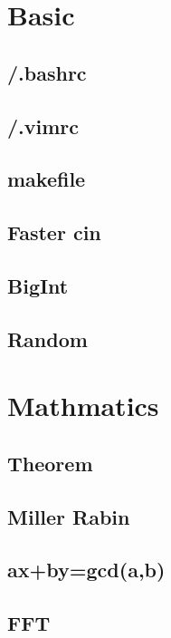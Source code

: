 \section{Basic}

\subsection{/.bashrc}

\subsection{/.vimrc}

\subsection{makefile}

\subsection{Faster cin }

\subsection{BigInt}

\subsection{Random}


\section{Mathmatics}

\subsection{Theorem}

\subsection{Miller Rabin}

\subsection{ax+by=gcd(a,b)}

\subsection{FFT}

